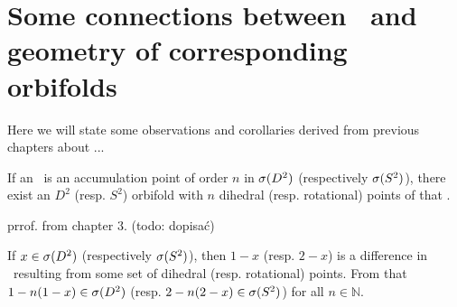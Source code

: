  
\section{Some connections between \Eoc\ and geometry of corresponding orbifolds}
Here we will state some observations and corollaries derived from previous chapters 
about ... 
\begin{observation}
If an \Eoc\ is an accumulation point of order $n$ in ${{\sigma}(D^2)}$ (respectively ${{\sigma}(S^2)}$), 
there exist an $D^2$ (resp. $S^2$) 
orbifold with $n$ dihedral (resp. rotational) points of that \Eoc. 
\end{observation}
prrof. from chapter 3. (todo: dopisać)
\begin{observation}\label{adding_multiplied_differences}
If $x \in {{\sigma}(D^2)}$ (respectively ${{\sigma}(S^2)}$), then $1-x$ (resp. $2-x$) is a difference in 
\Eoc\ resulting 
from some set of dihedral (resp. rotational) points. From that $1-n(1-x) \in {{\sigma}(D^2)}$ (resp. 
$2-n(2-x)\in {{\sigma}(S^2)}$) 
for all $n \in \mathbb{N}$. 
\end{observation}

